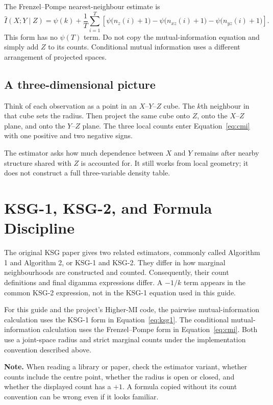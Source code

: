 \documentclass[11pt,letterpaper,oneside]{report}
\newcommand{\Note}[1]{\par\noindent\colorbox{notegray}{\parbox{0.965\linewidth}{\textbf{Note.} #1}}\par}
\begin{document}
The Frenzel--Pompe nearest-neighbour estimate is
\begin{equation}
  \widehat I(X;Y\mid Z)
  =\psi(k)+\frac{1}{T}\sum_{i=1}^{T}
  \left[\psi\bigl(n_z(i)+1\bigr)
  -\psi\bigl(n_{xz}(i)+1\bigr)
  -\psi\bigl(n_{yz}(i)+1\bigr)\right].
  \label{eq:cmi}
\end{equation}
This form has no $\psi(T)$ term. Do not copy the mutual-information equation and simply add $Z$ to its counts. Conditional mutual information uses a different arrangement of projected spaces.

\subsection{A three-dimensional picture}

Think of each observation as a point in an $X$--$Y$--$Z$ cube. The $k$th neighbour in that cube sets the radius. Then project the same cube onto $Z$, onto the $X$--$Z$ plane, and onto the $Y$--$Z$ plane. The three local counts enter Equation~\ref{eq:cmi} with one positive and two negative signs.

The estimator asks how much dependence between $X$ and $Y$ remains after nearby structure shared with $Z$ is accounted for. It still works from local geometry; it does not construct a full three-variable density table.

\section{KSG-1, KSG-2, and Formula Discipline}

The original KSG paper gives two related estimators, commonly called Algorithm 1 and Algorithm 2, or KSG-1 and KSG-2. They differ in how marginal neighbourhoods are constructed and counted. Consequently, their count definitions and final digamma expressions differ. A $-1/k$ term appears in the common KSG-2 expression, not in the KSG-1 equation used in this guide.

For this guide and the project's Higher-MI code, the pairwise mutual-information calculation uses the KSG-1 form in Equation~\ref{eq:ksg1}. The conditional mutual-information calculation uses the Frenzel--Pompe form in Equation~\ref{eq:cmi}. Both use a joint-space radius and strict marginal counts under the implementation convention described above.

\Note{When reading a library or paper, check the estimator variant, whether counts include the centre point, whether the radius is open or closed, and whether the displayed count has a $+1$. A formula copied without its count convention can be wrong even if it looks familiar.}
\end{document}
